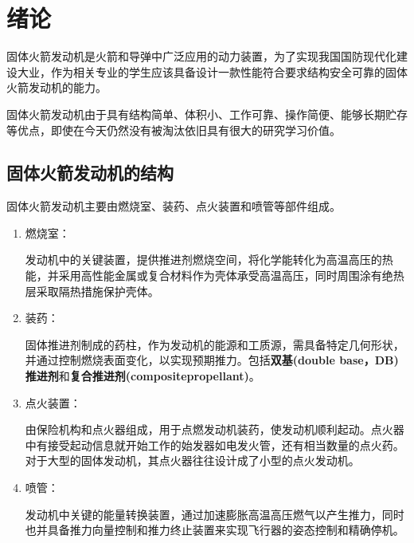 \chapter{绪论}
固体火箭发动机是火箭和导弹中广泛应用的动力装置，为了实现我国国防现代化建设大业，作为相关专业的学生应该具备设计一款性能符合要求结构安全可靠的固体火箭发动机的能力。

固体火箭发动机由于具有结构简单、体积小、工作可靠、操作简便、能够长期贮存等优点，即使在今天仍然没有被淘汰依旧具有很大的研究学习价值。
\section{固体火箭发动机的结构}
固体火箭发动机主要由燃烧室、装药、点火装置和喷管等部件组成。
\begin{enumerate}[leftmargin=2em]
  \item 燃烧室：
  
  发动机中的关键装置，提供推进剂燃烧空间，将化学能转化为高温高压的热能，并采用高性能金属或复合材料作为壳体承受高温高压，同时周围涂有绝热层采取隔热措施保护壳体。
  \item 装药：
  
  固体推进剂制成的药柱，作为发动机的能源和工质源，需具备特定几何形状，并通过控制燃烧表面变化，以实现预期推力。包括\textbf{双基(double base，DB)推进剂}和\textbf{复合推进剂(compositepropellant)}。

  \item 点火装置：
  
  由保险机构和点火器组成，用于点燃发动机装药，使发动机顺利起动。点火器中有接受起动信息就开始工作的始发器如电发火管，还有相当数量的点火药。对于大型的固体发动机，其点火器往往设计成了小型的点火发动机。

  \item 喷管：
  
  发动机中关键的能量转换装置，通过加速膨胀高温高压燃气以产生推力，同时也并具备推力向量控制和推力终止装置来实现飞行器的姿态控制和精确停机。
\end{enumerate}




